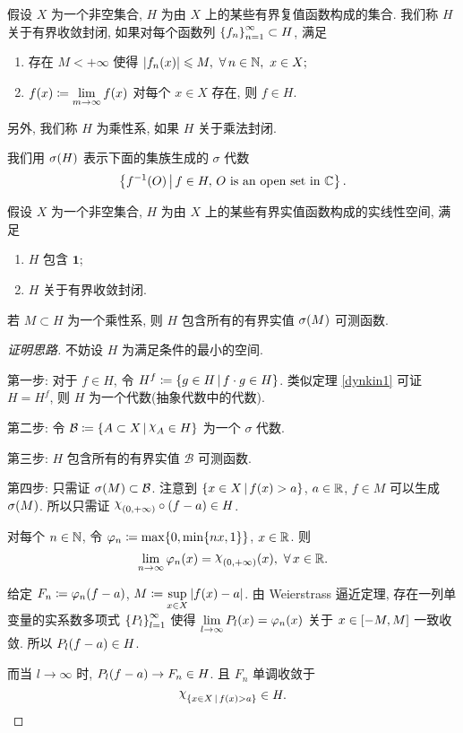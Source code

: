 \begin{definition}
假设 $X$ 为一个非空集合, $H$ 为由 $X$ 上的某些有界复值函数构成的集合. 我们称 $H$ 关于有界收敛封闭, 如果对每个函数列 $\left\{f_n\right\}_{n=1}^\infty\subset H$, 满足
\begin{enumerate}[\rm(1)]
\item 存在 $M<+\infty$ 使得 $|f_n\xk{x}|\leq M,\ \forall n\in\nn,\ x\in X;$
\item $f\xk{x}\dy\lim\limits_{m\to\infty}f\xk{x}$ 对每个 $x\in X$ 存在, 则 $f\in H$.
\end{enumerate}

另外, 我们称 $H$ 为乘性系, 如果 $H$ 关于乘法封闭.
\end{definition}

\begin{definition}
我们用 $\sigma\xk{H}$ 表示下面的集族生成的 $\sigma$ 代数
\[\jh{f^{-1}\xk{O}}{f\in H,\,O\mathrm{\ is\ an\ open\ set\ in\ }\cc}.\]
\end{definition}
\begin{theorem}
\label{dynkin2}
假设 $X$ 为一个非空集合, $H$ 为由 $X$ 上的某些有界实值函数构成的实线性空间, 满足
\begin{enumerate}[\rm(1)]
\item $H$ 包含 $\mathbf{1}$;
\item $H$ 关于有界收敛封闭.
\end{enumerate}
若 $M\subset H$ 为一个乘性系, 则 $H$ 包含所有的有界实值 $\sigma\xk{M}$ 可测函数.
\end{theorem}
\begin{proof}[证明思路]
不妨设 $H$ 为满足条件的最小的空间.\par
第一步: 对于 $f\in H$, 令 $H^f\coloneqq\left\{g\in H\,\middle\vert\,f\cdot g\in H\right\}$.  类似定理 \ref{dynkin1} 可证 $H=H^f$, 则 $H$ 为一个代数(抽象代数中的代数).\par 
第二步: 令 $\mathcal{B}\dy\jh{A\subset X}{\rchi_A\in H}$ 为一个 $\sigma$ 代数.\par 
第三步: $H$ 包含所有的有界实值 $\mathcal{B}$ 可测函数.\par 
第四步: 只需证 $\sigma\xk{M}\subset\mathcal{B}$. 注意到 $\jh{x\in X}{f\xk{x}>a}$, $a\in\mathbb{R}$, $f\in M$ 可以生成 $\sigma\xk{M}$. 所以只需证 $\rchi_{\xk{0,+\infty}}\circ\xk{f-a}\in H$.\par 
对每个 $n\in\mathbb{N}$, 令 $\phi_n\dy\max\dk{0,\min\dk{nx,1}}$, $x\in\mathbb{R}$.
则
\[\lim_{n\to\infty}\phi_n\xk{x}=\rchi_{\xk{0,+\infty}}\xk{x},\ \forall x\in\rr.\]

给定 $F_n\dy\phi_n\xk{f-a}$, $M\coloneqq\sup\limits_{x\in X}|f(x)-a|$. 由 Weierstrass 逼近定理, 存在一列单变量的实系数多项式 $\left\{P_l\right\}_{l=1}^\infty$ 使得 $\lim\limits_{l\to\infty}P_l\xk{x}=\phi_n\xk{x}$ 关于 $x\in\left[-M,M\right]$ 一致收敛. 所以 $P_l\xk{f-a}\in H$.\par 
而当 $l\to\infty$ 时, $P_l\xk{f-a}\to F_n\in H$. 且 $F_n$ 单调收敛于
\begin{equation*}
\rchi_{\jh{x\in X}{f\xk{x}>a}}\in H.\qedhere
\end{equation*}
\end{proof}
